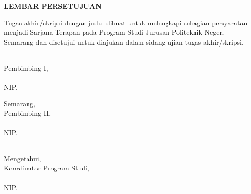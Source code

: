 
\newpage
{}
\begin{center}
    \begin{doublespace}
        \textbf{\large \MakeUppercase{lembar persetujuan}}
    \end{doublespace}
\end{center}
    
    \noindent Tugas akhir/skripsi dengan judul {\judulid} dibuat untuk melengkapi sebagian persyaratan menjadi Sarjana Terapan pada Program Studi {\prodii} Jurusan {\jurusan} Politeknik Negeri Semarang dan disetujui untuk diajukan dalam sidang ujian tugas akhir/skripsi.
   
\vspace*{0.5cm}
\begin{center}
    \begin{minipage}{0.4\textwidth}
    \hfill\\[2em]
    Pembimbing I,\\[2cm]
    \pembimbingsatu\\
    NIP. \NIPpembimbingsatu
\end{minipage}%
\hfill
\begin{minipage}{0.4\textwidth}
    Semarang, \tglpersetujuan\\[1em]
    Pembimbing II,\\[2cm]
    \pembimbingdua\\
    NIP. \NIPpembimbingdua
\end{minipage}%
\end{center}
    
\begin{center}
    \begin{minipage}{0.35\textwidth}
    \hfill\\[2em]
    \centering
    Mengetahui,\\
    Koordinator Program Studi,\\[2cm]
    \koorprodi\\
    NIP. \NIPkoorprodi
\end{minipage}
\end{center}

